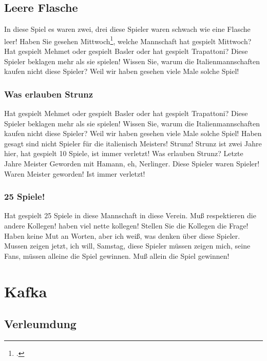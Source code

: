 \subsection{Leere Flasche}

 In diese Spiel es waren zwei, drei diese Spieler waren schwach wie eine Flasche leer! Haben Sie gesehen Mittwoch\footcite{mitrednf2021}, welche Mannschaft hat gespielt Mittwoch? Hat gespielt Mehmet oder gespielt Basler oder hat gespielt Trapattoni? Diese Spieler beklagen mehr als sie spielen! Wissen Sie, warum die Italienmannschaften kaufen nicht diese Spieler? Weil wir haben gesehen viele Male solche Spiel!
 
 \subsubsection{Was erlauben Strunz}
 
  Hat gespielt Mehmet oder gespielt Basler oder hat gespielt Trapattoni? Diese Spieler beklagen mehr als sie spielen! Wissen Sie, warum die Italienmannschaften kaufen nicht diese Spieler? Weil wir haben gesehen viele Male solche Spiel! Haben gesagt sind nicht Spieler für die italienisch Meisters! Strunz! Strunz ist zwei Jahre hier, hat gespielt 10 Spiele, ist immer verletzt! Was erlauben Strunz? Letzte Jahre Meister Geworden mit Hamann, eh, Nerlinger. Diese Spieler waren Spieler! Waren Meister geworden! Ist immer verletzt!
  
  \subsubsection{25 Spiele!}
  
   Hat gespielt 25 Spiele in diese Mannschaft in diese Verein. Muß respektieren die andere Kollegen! haben viel nette kollegen! Stellen Sie die Kollegen die Frage! Haben keine Mut an Worten, aber ich weiß, was denken über diese Spieler. Mussen zeigen jetzt, ich will, Samstag, diese Spieler müssen zeigen mich, seine Fans, müssen alleine die Spiel gewinnen. Muß allein die Spiel gewinnen!
   
\section{Kafka}

\subsection{Verleumdung}

